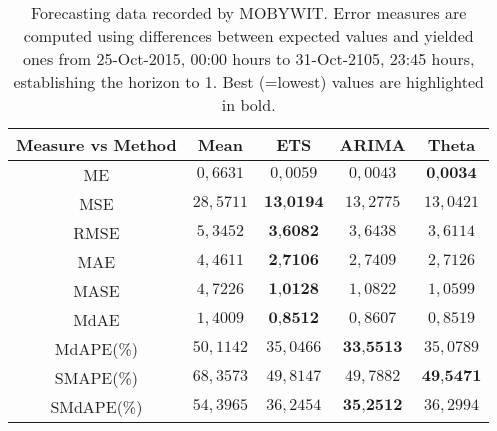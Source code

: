 \begin{table}
{\scriptsize
\centering
\begin{tabular}{|c|c|c|c|c|}
\hline
Measure vs Method &Mean &ETS &ARIMA &Theta\\
\hline
ME &$0,6631$ & $0,0059$ & $0,0043$ & $\textbf{0,0034}$\\
MSE &$28,5711$ & $\textbf{13,0194}$ & $13,2775$ & $13,0421$\\
RMSE &$5,3452$ & $\textbf{3,6082}$ & $3,6438$ & $3,6114$\\
MAE &$4,4611$ & $\textbf{2,7106}$ & $2,7409$ & $2,7126$\\
MASE &$4,7226$ & $\textbf{1,0128}$ & $1,0822$ & $1,0599$\\
MdAE &$1,4009$ & $\textbf{0,8512}$ & $0,8607$ & $0,8519$\\
MdAPE(\%) &$50,1142$ & $35,0466$ & $\textbf{33,5513}$ & $35,0789$\\
 SMAPE(\%) &$68,3573$ & $49,8147$ & $49,7882$ & $\textbf{49,5471}$\\
 SMdAPE(\%) &$54,3965$ & $36,2454$ & $\textbf{35,2512}$ & $36,2994$\\
\hline
\end{tabular}
}
\caption{Forecasting data recorded by MOBYWIT. Error measures are computed using differences between expected values and yielded ones from 25-Oct-2015, 00:00 hours to 31-Oct-2105, 23:45 hours, establishing the horizon to 1. Best (=lowest) values are highlighted in bold.}
\label{tab:forecasting}
\end{table}
